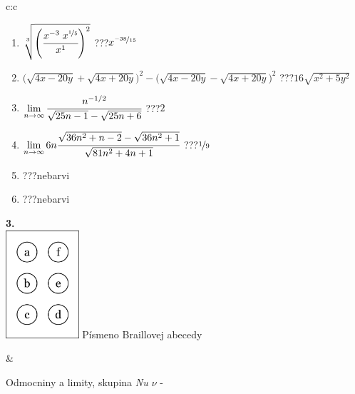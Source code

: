 \documentclass[10pt]{report}
\begin{document}
\begin{tabular}{c:c}
\begin{minipage}[c][104.5mm][t]{0.5\linewidth}
\begin{center}
\begin{minipage}{0.79\linewidth}
\begin{center}
\begin{varwidth}{\linewidth}
\begin{enumerate}
\small
\item $\sqrt[3]{\left(\cfrac{x^{-3}\;x^{\nicefrac{1}{5}}}{x^{1}}\right)^{2}}$\quad \dotfill\; ???\;\dotfill \quad $x^{\nicefrac{-38}{15}}$
\item {\footnotesize{\scriptsize$\big(\sqrt{4x-20y}+\sqrt{4x+20y}\big)^2-\big(\sqrt{4x-20y}-\sqrt{4x+20y}\big)^2$}\quad \dotfill\; ???\;\dotfill \quad $16\sqrt{x^2+5y^2}$}
\item $\lim\limits_{n\to\infty}\cfrac{n^{-1/2}}{\sqrt{25n-1}-\sqrt{25n+6}}$\quad \dotfill\; ???\;\dotfill \quad $2$
\item $\lim\limits_{n\to\infty}6n\cfrac{\sqrt{36n^2+n-2}-\sqrt{36n^2+1}}{\sqrt{81n^2+4n+1}}$\quad \dotfill\; ???\;\dotfill \quad $\nicefrac{1}{9}$
\item \quad \dotfill\; ???\;\dotfill \quad nebarvi
\item \quad \dotfill\; ???\;\dotfill \quad nebarvi
\end{enumerate}
\end{varwidth}
\end{center}
\end{minipage}
\begin{minipage}{0.20\linewidth}
\begin{center}
{\Huge\bfseries 3.} \\[2mm]
\includegraphics[height=40mm]{../images/braille.png}
{\small Písmeno Braillovej abecedy}
\end{center}
\end{minipage}
\end{center}
\end{minipage}
&
\begin{minipage}[c][104.5mm][t]{0.5\linewidth}
\begin{center}
\vspace{7mm}
{\huge Odmocniny a limity, skupina \textit{Nu $\nu$} -}\\[5mm]

\end{center}
\end{minipage}
\end{tabular}
\end{document}
